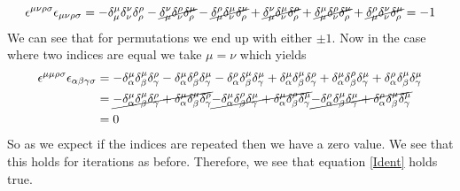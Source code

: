 \documentclass[11pt]{article}
\numberwithin{equation}{section}
\begin{document}
\begin{enumerate}[(a)]
      $$\epsilon^{\mu\nu\rho\sigma}\epsilon_{\mu\nu\rho\sigma} = 
            -\delta^{\mu}_{\mu}\delta^{\nu}_{\nu}\delta^{\rho}_{\rho}
            -\cancel{\delta^{\nu}_{\mu}\delta^{\rho}_{\nu}\delta^{\mu}_{\rho}}
            -\cancel{\delta^{\rho}_{\mu}\delta^{\mu}_{\nu}\delta^{\nu}_{\rho}}
            +\cancel{\delta^{\nu}_{\mu}\delta^{\mu}_{\nu}\delta^{\rho}_{\rho}}
            +\cancel{\delta^{\mu}_{\mu}\delta^{\rho}_{\nu}\delta^{\nu}_{\rho}}
            +\cancel{\delta^{\rho}_{\mu}\delta^{\nu}_{\nu}\delta^{\mu}_{\rho}} = -1$$
    We can see that for permutations we end up with either $\pm1$. Now in the case where two indices are equal we 
    take $\mu=\nu$ which yields
    \begin{align*}
        \epsilon^{\mu\mu\rho\sigma}\epsilon_{\alpha\beta\gamma\sigma} &= 
            -\delta^{\mu}_{\alpha}\delta^{\mu}_{\beta}\delta^{\rho}_{\gamma}
            -\delta^{\mu}_{\alpha}\delta^{\rho}_{\beta}\delta^{\mu}_{\gamma}
            -\delta^{\rho}_{\alpha}\delta^{\mu}_{\beta}\delta^{\mu}_{\gamma}
            +\delta^{\mu}_{\alpha}\delta^{\mu}_{\beta}\delta^{\rho}_{\gamma}
            +\delta^{\mu}_{\alpha}\delta^{\rho}_{\beta}\delta^{\mu}_{\gamma}
            +\delta^{\rho}_{\alpha}\delta^{\mu}_{\beta}\delta^{\mu}_{\gamma}\\
            &= \cancel{-\delta^{\mu}_{\alpha}\delta^{\mu}_{\beta}\delta^{\rho}_{\gamma}
            +\delta^{\mu}_{\alpha}\delta^{\mu}_{\beta}\delta^{\rho}_{\gamma}}
            \cancel{-\delta^{\mu}_{\alpha}\delta^{\rho}_{\beta}\delta^{\mu}_{\gamma}
            +\delta^{\mu}_{\alpha}\delta^{\rho}_{\beta}\delta^{\mu}_{\gamma}}
            \cancel{-\delta^{\rho}_{\alpha}\delta^{\mu}_{\beta}\delta^{\mu}_{\gamma}
            +\delta^{\rho}_{\alpha}\delta^{\mu}_{\beta}\delta^{\mu}_{\gamma}}\\
            &= 0
    \end{align*}
    So as we expect if the indices are repeated then we have a zero value. We see that this holds for iterations as
    before. Therefore, we see that equation \ref{Ident} holds true.


\end{enumerate}
\end{document}

